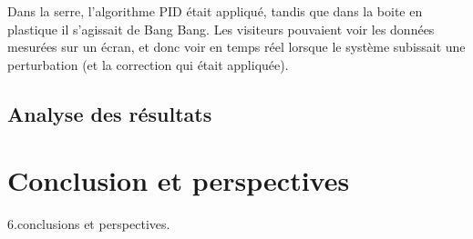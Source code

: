 \documentclass[a4paper,10pt]{report}
\begin{document}
Dans la serre, l'algorithme PID était appliqué, tandis que dans la boite en plastique il s'agissait de Bang Bang. Les visiteurs pouvaient voir les données mesurées sur un écran, et donc voir en temps réel lorsque le système subissait une perturbation (et la correction qui était appliquée).

\section{Analyse des résultats}

\chapter{Conclusion et perspectives}
6.conclusions et perspectives.




\end{document}
